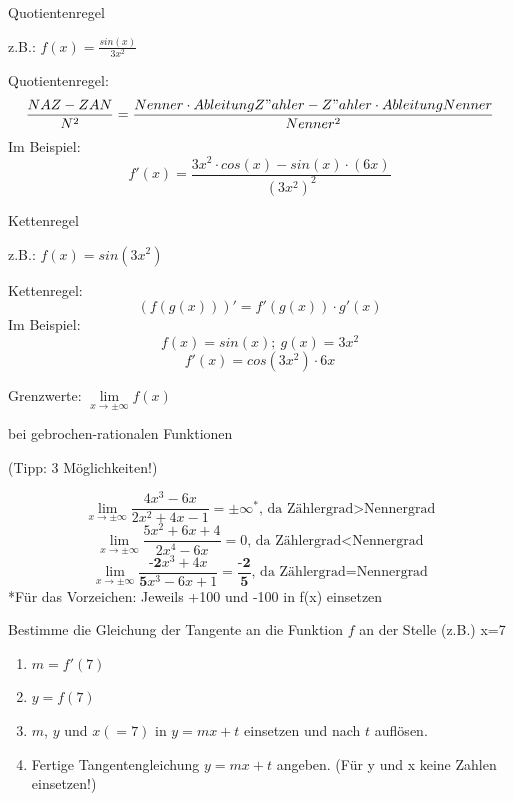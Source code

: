 \documentclass[paper=a6,landscape,ngerman,twoside=true,fontsize=12pt]{scrartcl}
\begin{document}
\begin{frage}
	Quotientenregel
	
	z.B.: $f(x)=\frac{sin(x)}{3x^2}$
	
\end{frage}
\begin{antwort}
	Quotientenregel:
	\normalsize
	\[
	\frac{NAZ-ZAN}{N^2}=\frac{Nenner \cdot AbleitungZ{"a}hler-Z{"a}hler \cdot AbleitungNenner}{Nenner^2}
	\]
	\Large
	Im Beispiel:
	\[
	f'(x)=\frac{3x^2 \cdot cos(x) - sin(x) \cdot (6x)}{(3x^2)^2}
	\]
\end{antwort}
\begin{frage}
	Kettenregel
	
	z.B.: $f(x)={sin(3x^2)}$
	
\end{frage}
\begin{antwort}
	Kettenregel:
	\[
	(f(g(x)))'=f'(g(x))\cdot g'(x)
	\]
	Im Beispiel:
	\[
	f(x)=sin(x);~ g(x)=3x^2\]
	\[f'(x)=cos(3x^2)\cdot 6x
	\]
\end{antwort}
\begin{frage}
	Grenzwerte: $\lim\limits_{x \rightarrow \pm\infty}{f(x)}$
	\bigskip
	
	bei gebrochen-rationalen Funktionen
	
	(Tipp: 3 Möglichkeiten!)
	
\end{frage}
\begin{antwort}
	\large
	\[
	\lim\limits_{x \rightarrow \pm\infty}{\frac{4x^3 - 6x}{2x^2+4x-1}}=\pm\infty^*\text{, da Zählergrad>Nennergrad}
	\]
	\[
	\lim\limits_{x \rightarrow \pm\infty}{\frac{5x^2+6x+4}{2x^4-6x}}=0\text{, da Zählergrad<Nennergrad}
	\]
	\[
	\lim\limits_{x \rightarrow \pm\infty}{\frac{\textbf{-2}x^3+4x}{\textbf{5}x^3 - 6x+1}}=\frac{\textbf{-2}}{\textbf{5}}\text{, da Zählergrad=Nennergrad}
	\]
	\footnotesize 
	*Für das Vorzeichen: Jeweils +100 und -100 in f(x) einsetzen
\end{antwort}
\begin{frage}
	Bestimme die Gleichung der Tangente an die Funktion $f$ an der Stelle (z.B.) x=7
\end{frage}
\begin{antwort}
	\begin{enumerate}
		\item $m=f'(7)$
		\item $y=f(7)$
		\item $m$, $y$ und $x(=7)$ in $y= mx+t$ einsetzen und nach $t$ auflösen.
		\item Fertige Tangentengleichung $y= mx+t$ angeben. (Für y und x keine Zahlen einsetzen!)
		
	\end{enumerate}
\end{antwort}
\end{document}
